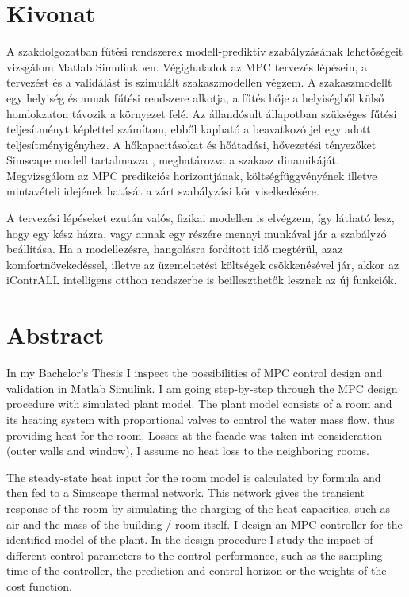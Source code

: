 \chapter*{Kivonat}

A szakdolgozatban fűtési rendszerek modell-prediktív szabályzásának lehetőségeit vizsgálom Matlab Simulinkben.
Végighaladok az MPC tervezés lépésein, a tervezést és a validálást is szimulált szakaszmodellen végzem. A szakaszmodellt egy helyiség és annak fűtési rendszere alkotja, a fűtés hője a helyiségből külső homlokzaton távozik a környezet felé. Az állandósult állapotban szükséges fűtési teljesítményt képlettel számítom, ebből kapható a beavatkozó jel egy adott teljesítményigényhez. A hőkapacitásokat és hőátadási, hővezetési tényezőket Simscape modell tartalmazza%
, meghatározva a szakasz dinamikáját. Megvizsgálom az MPC predikciós horizontjának, költségfüggvényének illetve mintavételi idejének hatását a zárt szabályzási kör viselkedésére. 


A tervezési lépéseket ezután valós, fizikai modellen is elvégzem, így látható lesz, hogy egy kész házra, vagy annak egy részére mennyi munkával jár a szabályzó beállítása. Ha a modellezésre, hangolásra fordított idő megtérül, azaz komfortnövekedéssel, illetve az üzemeltetési költségek csökkenésével jár, akkor az iContrALL intelligens otthon rendszerbe is beilleszthetők lesznek az új funkciók.

\chapter*{Abstract}

In my Bachelor's Thesis I inspect the possibilities of MPC control design and validation in Matlab Simulink. I am going step-by-step through the MPC design procedure with simulated plant model. The plant model consists of a room and its heating system with proportional valves to control the water mass flow, thus providing heat for the room. Losses at the facade was taken int consideration (outer walls and window), I assume no heat loss to the neighboring rooms.

The steady-state heat input for the room model is calculated by formula and then fed to a Simscape thermal network. This network gives the transient response of the room by simulating the charging of the heat capacities, such as air and the mass of the building / room itself. %
I design an MPC controller for the identified model of the plant. In the design procedure I study the impact of different control parameters to the control performance, such as the sampling time of the controller, the prediction and control horizon or the weights of the cost function.

